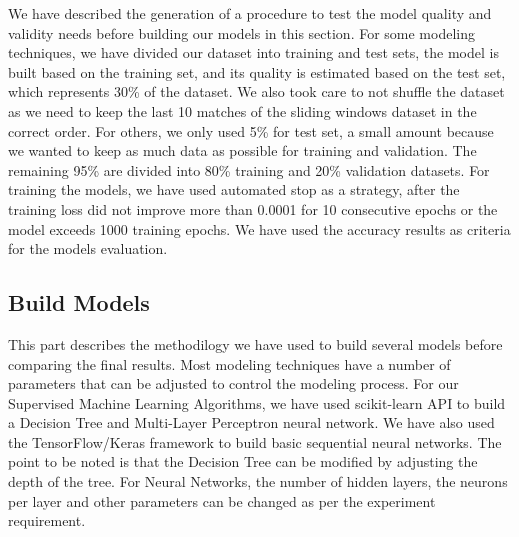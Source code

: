 We have described the generation of a procedure to test the model quality and validity needs before building our models in this section. \newline \newline
For some modeling techniques, we have divided our dataset into training and test sets, the model is built based on the training set, and its quality is estimated based on the test set, which represents 30\% of the dataset. \newline
We also took care to not shuffle the dataset as we need to keep the last 10 matches of the sliding windows dataset in the correct order. \newline 
For others, we only used 5\% for test set, a small amount because we wanted to keep as much data as possible for training and validation. The remaining 95\% are divided into 80\% training and 20\% validation datasets.\newline \newline
For training the models, we have used automated stop as a strategy, after the training loss did not improve more than 0.0001 for 10 consecutive epochs or the model exceeds 1000 training epochs.\newline 
We have used the accuracy results as criteria for the models evaluation.

\subsection{Build Models}

This part describes the methodilogy we have used to build several models before comparing the final results.\newline
Most modeling techniques have a number of parameters that can be adjusted to control the modeling process.\newline \newline
For our Supervised Machine Learning Algorithms, we have used scikit-learn API to build a Decision Tree and Multi-Layer Perceptron neural network. We have also used the TensorFlow/Keras framework to build basic sequential neural networks.\newline \newline
The point to be noted is that the Decision Tree can be modified by adjusting the depth of the tree. For Neural Networks,  the number of hidden layers, the neurons per layer and other parameters can be changed as per the experiment requirement.


